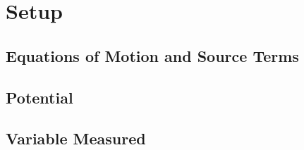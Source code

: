 
\section{Setup}

\subsection{Equations of Motion and Source Terms}

\subsection{Potential}

\subsection{Variable Measured}
